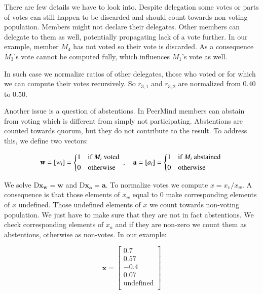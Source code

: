 \documentclass{sigchi}
\begin{document}
There are few details we have to look into.
Despite delegation some votes or parts of votes can still happen to be discarded and should count
towards non-voting population.
Members might not declare their delegates.
Other members can delegate to them as well, potentially propagating lack of a vote further.
In our example, member $M_4$ has not voted so their vote is discarded.
As a consequence $M_3$'s vote cannot be computed fully, which influences $M_1$'s vote as well.

In such case we normalize ratios of other delegates, those who voted or for which we can
compute their votes recursively.
So $r_{3,1}$ and $r_{3,2}$ are normalized from $0.40$ to $0.50$.

Another issue is a question of abstentions.
In PeerMind members can abstain from voting which is different from simply not participating.
Abstentions are counted towards quorum, but they do not contribute to the result.
To address this, we define two vectors:

\begin{displaymath}
\mathbf{w} = \left[w_{i}\right] = \begin{dcases*}
 1 & if $M_i$ voted \\
 0 & otherwise \\
\end{dcases*},\quad \mathbf{a} = \left[a_{i}\right] = \begin{dcases*}
 1 & if $M_i$ abstained \\
 0 & otherwise \\
\end{dcases*}
\end{displaymath}

We solve $\mathrm{D} \mathbf{x_w} = \mathbf{w}$ and $\mathrm{D} \mathbf{x_a} = \mathbf{a}$.
To normalize votes we compute $x = x_v / x_w$.
A consequence is that those elements of $x_w$ equal to $0$ make corresponding elements of $x$ undefined.
Those undefined elements of $x$ we count towards non-voting population.
We just have to make sure that they are not in fact abstentions.
We check corresponding elements of $x_a$ and if they are non-zero we count them as abstentions,
otherwise as non-votes.
In our example:

\begin{displaymath}
\mathbf{x} = \left[ \begin{array}{c}
0.7 \\
0.57 \\
-0.4 \\
0.07 \\
\mathrm{undefined} \\
\end{array} \right]
\end{displaymath}
\end{document}
